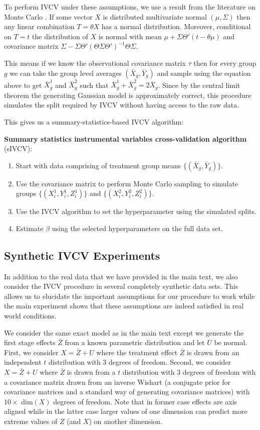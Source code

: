 \documentclass{article}
\begin{document}
To perform IVCV under these assumptions, we use a result from the literature on Monte Carlo \citep[ch. 8]{owen_mcbook}. If some vector $X$ is distributed multivariate normal $(\mu, \Sigma)$ then any linear combination $T = \theta X$ has a normal distribution. Moreover, conditional on $T=t$ the distribution of $X$ is normal with mean $\mu + \Sigma \Theta' (t - \theta \mu)$ and covariance matrix $\Sigma - \Sigma \Theta' (\Theta \Sigma \Theta')^{-1} \Theta \Sigma.$ 

This means if we know the observational covariance matrix $\tau$ then for every group $g$ we can take the group level averages $(\bar{X}_g, \bar{Y}_g)$ and sample using the equation above to get $\bar{X}^1_g$ and $\bar{X}^2_g$ such that $\bar{X}^1_g + \bar{X}^2_g = 2\bar{X}_g$. Since by the central limit theorem the generating Gaussian model is approximately correct, this procedure simulates the split required by IVCV without having access to the raw data.

This gives us a summary-statistics-based IVCV algorithm:

\textbf{Summary statistics instrumental variables cross-validation algorithm} (sIVCV):
\begin{enumerate} 
\item Start with data comprising of treatment group means $\lbrace (\bar{X}_g, \bar{Y}_g) \rbrace$.
\item Use the covariance matrix to perform Monte Carlo sampling to simulate groups $\lbrace (X^1_i, Y^1_i, Z^1_i) \rbrace$ and $\lbrace (X^2_i, Y^2_i, Z^2_i) \rbrace$.
\item Use the IVCV algorithm to set the hyperparameter using the simulated splits.
\item Estimate $\beta$ using the selected hyperparameters on the full data set.
\end{enumerate}

\subsection{Synthetic IVCV Experiments}
In addition to the real data that we have provided in the main text, we also consider the IVCV procedure in several completely synthetic data sets. This allows us to elucidate the important assumptions for our procedure to work while the main experiment shows that these assumptions are indeed satisfied in real world conditions. 

We consider the same exact model as in the main text except we generate the first stage effects $\bar{Z}$ from a known parametric distribution and let $U$ be normal. First, we consider $X = \bar{Z} + U$ where the treatment effect $\bar{Z}$ is drawn from an independent $t$ distribution with $3$ degrees of freedom. Second, we consider $X = \bar{Z} + U$ where $\bar{Z}$ is drawn from a $t$ distribution with $3$ degrees of freedom with a covariance matrix drawn from an inverse Wishart (a conjugate prior for covariance matrices and a standard way of generating covariance matrices) with $10 \times$ dim$(X) $ degrees of freedom. Note that in former case effects are axis aligned while in the latter case larger values of one dimension can predict more extreme values of $Z$ (and $X$) on another dimension. 
\end{document}
